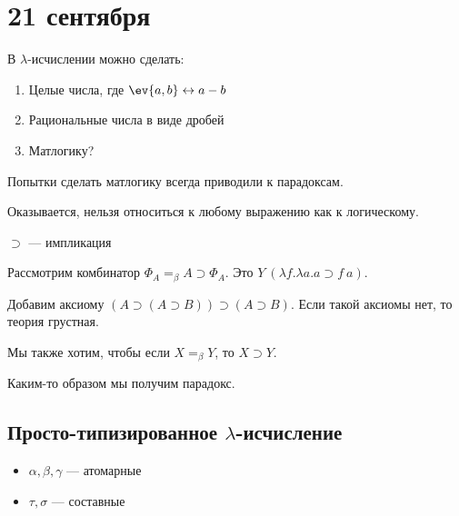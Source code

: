 \chapter{21 сентября}

В \(\lambda\)-исчислении можно сделать:
\begin{enumerate}
    \item Целые числа, где \(\ev{a, b} \leftrightarrow a - b\)
    \item Рациональные числа в виде дробей
    \item Матлогику?
\end{enumerate}

Попытки сделать матлогику всегда приводили к парадоксам.

Оказывается, нельзя относиться к любому выражению как к логическому.

\begin{obozn}
    \(\supset\) --- импликация
\end{obozn}

\begin{example}
    Рассмотрим комбинатор \(\Phi_A =_\beta A \supset \Phi_A\). Это \(Y\ (\lambda f.\lambda a.a \supset f\ a)\).

    Добавим аксиому \((A \supset (A \supset B)) \supset (A \supset B)\). Если такой аксиомы нет, то теория грустная.

    Мы также хотим, чтобы если \(X =_\beta Y\), то \(X \supset Y\).

    Каким-то образом мы получим парадокс.
\end{example}

\section{Просто-типизированное \(\lambda\)-исчисление}

\begin{definition}\itemfix
    \begin{itemize}
        \item \(\alpha, \beta, \gamma\) --- атомарные
        \item \(\tau, \sigma\) --- составные
    \end{itemize}
\end{definition}


